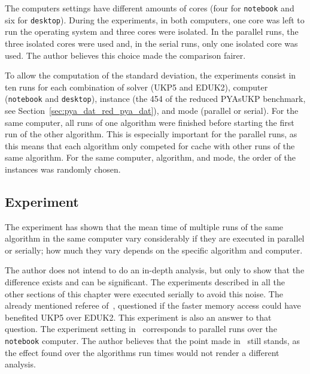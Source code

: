 The computers settings have different amounts of cores (four for \verb+notebook+ and six for \verb+desktop+).
During the experiments, in both computers, one core was left to run the operating system and three cores were isolated.
In the parallel runs, the three isolated cores were used and, in the serial runs, only one isolated core was used.
The author believes this choice made the comparison fairer.

To allow the computation of the standard deviation, the experiments consist in ten runs for each combination of solver (UKP5 and EDUK2), computer (\verb+notebook+ and \verb+desktop+), instance (the 454 of the reduced PYAsUKP benchmark, see Section~\ref{sec:pya_dat_red_pya_dat}), and mode (parallel or serial).
For the same computer, all runs of one algorithm were finished before starting the first run of the other algorithm.
This is especially important for the parallel runs, as this means that each algorithm only competed for cache with other runs of the same algorithm.
For the same computer, algorithm, and mode, the order of the instances was randomly chosen.

\subsection{Experiment}

The experiment has shown that the mean time of multiple runs of the same algorithm in the same computer vary considerably if they are executed in parallel or serially; how much they vary depends on the specific algorithm and computer.

The author does not intend to do an in-depth analysis, but only to show that the difference exists and can be significant.
The experiments described in all the other sections of this chapter were executed serially to avoid this noise.
The already mentioned referee of~\cite{sea2016}, questioned if the faster memory access could have benefited UKP5 over EDUK2.
This experiment is also an answer to that question.
The experiment setting in~\cite{sea2016} corresponds to parallel runs over the \verb+notebook+ computer.
The author believes that the point made in~\cite{sea2016} still stands, as the effect found over the algorithms run times would not render a different analysis.


